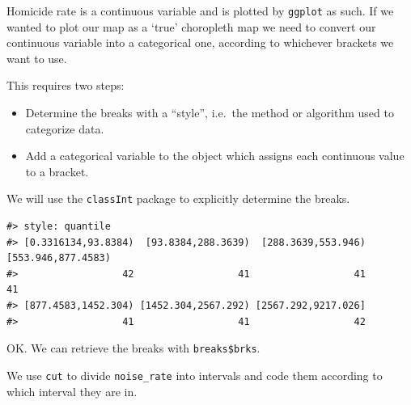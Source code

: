 \documentclass[
  11pt,
]{book}
\newenvironment{Shaded}{\begin{snugshade}}{\end{snugshade}}
\newcommand{\AttributeTok}[1]{\textcolor[rgb]{0.77,0.63,0.00}{#1}}
\newcommand{\CommentTok}[1]{\textcolor[rgb]{0.56,0.35,0.01}{\textit{#1}}}
\newcommand{\DecValTok}[1]{\textcolor[rgb]{0.00,0.00,0.81}{#1}}
\newcommand{\FunctionTok}[1]{\textcolor[rgb]{0.00,0.00,0.00}{#1}}
\newcommand{\NormalTok}[1]{#1}
\newcommand{\OtherTok}[1]{\textcolor[rgb]{0.56,0.35,0.01}{#1}}
\newcommand{\SpecialCharTok}[1]{\textcolor[rgb]{0.00,0.00,0.00}{#1}}
\newcommand{\StringTok}[1]{\textcolor[rgb]{0.31,0.60,0.02}{#1}}
\providecommand{\tightlist}{%
  \setlength{\itemsep}{0pt}\setlength{\parskip}{0pt}}
\begin{document}
Homicide rate is a continuous variable and is plotted by \texttt{ggplot} as such. If we wanted to plot our map as a `true' choropleth map we need to convert our continuous variable into a categorical one, according to whichever brackets we want to use.

This requires two steps:

\begin{itemize}
\tightlist
\item
  Determine the breaks with a ``style'', i.e.~the method or algorithm used to categorize data.
\item
  Add a categorical variable to the object which assigns each continuous value to a bracket.
\end{itemize}

We will use the \texttt{classInt} package to explicitly determine the breaks.

\begin{Shaded}
\end{Shaded}

\begin{verbatim}
#> style: quantile
#> [0.3316134,93.8384)  [93.8384,288.3639)  [288.3639,553.946)  [553.946,877.4583) 
#>                  42                  41                  41                  41 
#> [877.4583,1452.304) [1452.304,2567.292) [2567.292,9217.026] 
#>                  41                  41                  42
\end{verbatim}

OK. We can retrieve the breaks with \texttt{breaks\$brks}.

We use \texttt{cut} to divide \texttt{noise\_rate} into intervals and code them according to which interval they are in.
\end{document}
